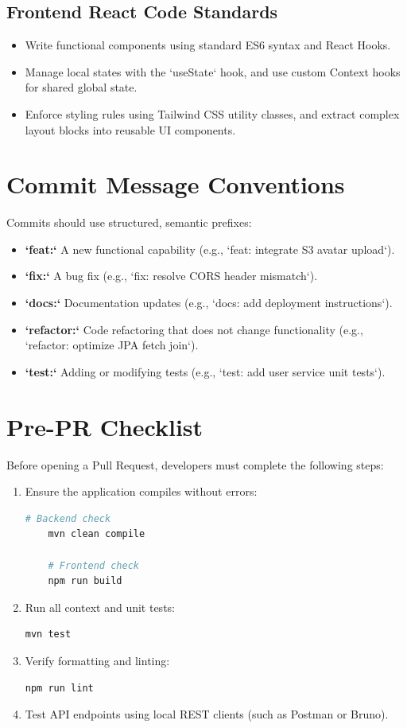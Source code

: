 \subsection{Frontend React Code Standards}
\begin{itemize}
    \item Write functional components using standard ES6 syntax and React Hooks.
    \item Manage local states with the `useState` hook, and use custom Context hooks for shared global state.
    \item Enforce styling rules using Tailwind CSS utility classes, and extract complex layout blocks into reusable UI components.
\end{itemize}

\section{Commit Message Conventions}
Commits should use structured, semantic prefixes:
\begin{itemize}
    \item \textbf{`feat:`} A new functional capability (e.g., `feat: integrate S3 avatar upload`).
    \item \textbf{`fix:`} A bug fix (e.g., `fix: resolve CORS header mismatch`).
    \item \textbf{`docs:`} Documentation updates (e.g., `docs: add deployment instructions`).
    \item \textbf{`refactor:`} Code refactoring that does not change functionality (e.g., `refactor: optimize JPA fetch join`).
    \item \textbf{`test:`} Adding or modifying tests (e.g., `test: add user service unit tests`).
\end{itemize}

\section{Pre-PR Checklist}
Before opening a Pull Request, developers must complete the following steps:
\begin{enumerate}
    \item Ensure the application compiles without errors:
    \begin{lstlisting}[language=bash]
    # Backend check
    mvn clean compile
    
    # Frontend check
    npm run build
    \end{lstlisting}
    \item Run all context and unit tests:
    \begin{lstlisting}[language=bash]
    mvn test
    \end{lstlisting}
    \item Verify formatting and linting:
    \begin{lstlisting}[language=bash]
    npm run lint
    \end{lstlisting}
    \item Test API endpoints using local REST clients (such as Postman or Bruno).
\end{enumerate}
